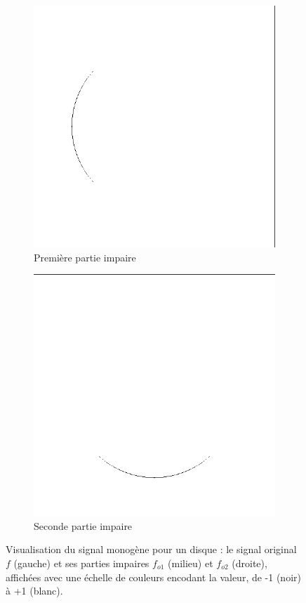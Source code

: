 \begin{figure}
\begin{subfigure}[b]{.3\textwidth}
        \includegraphics[width=\textwidth]{contenu/resources/images/r2_disk}
        \caption{Première partie impaire}
    \end{subfigure}
    \hfill
    \begin{subfigure}[b]{.3\textwidth}
        \includegraphics[width=\textwidth]{contenu/resources/images/r1_disk}
        \caption{Seconde partie impaire}
    \end{subfigure}
    \caption[Visualisation du signal monogène pour un disque]{Visualisation du signal monogène pour un disque : le signal original $f$ (gauche) et ses parties impaires $f_{o1}$ (milieu) et  $f_{o2}$ (droite), affichées avec une échelle de couleurs encodant la valeur, de -1 (noir) à +1 (blanc).}
    \label{fig:monogenic-signal-disk}
\end{figure}

